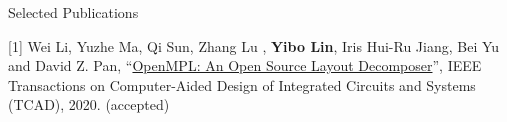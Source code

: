 \begin{rSection}{Selected Publications}



%        
%
%    
%
%            
%
    

        

    

            

            

\item[{[1]}]{
        Wei Li, Yuzhe Ma, Qi Sun,  Zhang Lu , \textbf{Yibo Lin}, Iris Hui-Ru Jiang, Bei Yu and David Z. Pan, 
    ``\href{https://doi.org/10.1109/TCAD.2020.3042175}{OpenMPL: An Open Source Layout Decomposer}'', 
    IEEE Transactions on Computer-Aided Design of Integrated Circuits and Systems (TCAD), 2020.
    (accepted)
}
            

\end{rSection}
